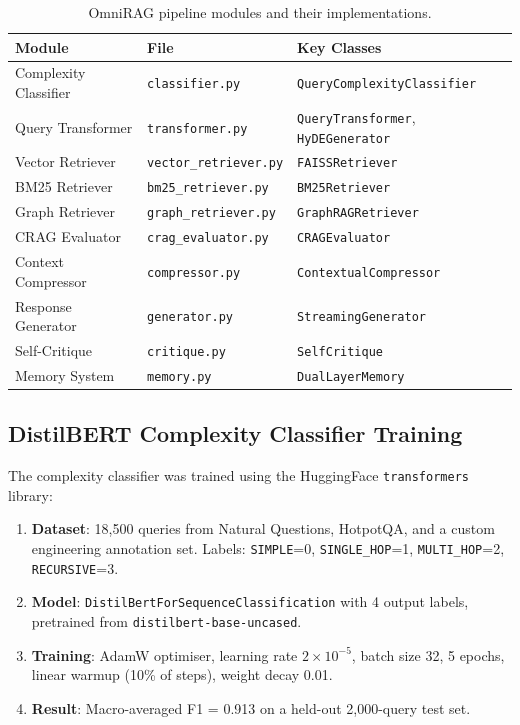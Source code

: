 \begin{table}[ht]
    \centering
    \caption{OmniRAG pipeline modules and their implementations.}
    \label{tab:omnirag-modules}
    \renewcommand{\arraystretch}{1.3}
    \begin{tabular}{l p{4.5cm} p{5.5cm}}
        \toprule
        \textbf{Module} & \textbf{File} & \textbf{Key Classes} \\
        \midrule
        Complexity Classifier & \texttt{classifier.py} & \texttt{QueryComplexityClassifier} \\
        Query Transformer & \texttt{transformer.py} & \texttt{QueryTransformer}, \texttt{HyDEGenerator} \\
        Vector Retriever & \texttt{vector\_retriever.py} & \texttt{FAISSRetriever} \\
        BM25 Retriever & \texttt{bm25\_retriever.py} & \texttt{BM25Retriever} \\
        Graph Retriever & \texttt{graph\_retriever.py} & \texttt{GraphRAGRetriever} \\
        CRAG Evaluator & \texttt{crag\_evaluator.py} & \texttt{CRAGEvaluator} \\
        Context Compressor & \texttt{compressor.py} & \texttt{ContextualCompressor} \\
        Response Generator & \texttt{generator.py} & \texttt{StreamingGenerator} \\
        Self-Critique & \texttt{critique.py} & \texttt{SelfCritique} \\
        Memory System & \texttt{memory.py} & \texttt{DualLayerMemory} \\
        \bottomrule
    \end{tabular}
\end{table}

\subsection{DistilBERT Complexity Classifier Training}
\label{subsec:classifier-training}

The complexity classifier was trained using the HuggingFace \texttt{transformers} library:

\begin{enumerate}
    \item \textbf{Dataset}: 18,500 queries from Natural Questions, HotpotQA, and a custom engineering annotation set. Labels: \texttt{SIMPLE}=0, \texttt{SINGLE\_HOP}=1, \texttt{MULTI\_HOP}=2, \texttt{RECURSIVE}=3.
    \item \textbf{Model}: \texttt{DistilBertForSequenceClassification} with 4 output labels, pretrained from \texttt{distilbert-base-uncased}.
    \item \textbf{Training}: AdamW optimiser, learning rate $2 \times 10^{-5}$, batch size 32, 5 epochs, linear warmup (10\% of steps), weight decay 0.01.
    \item \textbf{Result}: Macro-averaged F1 = 0.913 on a held-out 2,000-query test set.
\end{enumerate}

